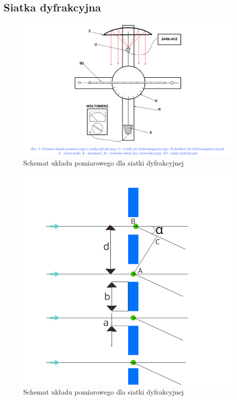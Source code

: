 \documentclass[a4paper]{article}
\newlength{\du}
\begin{document}
\newpage

\subsection{Siatka dyfrakcyjna}
\begin{figure}[h]
\centering
\includegraphics[scale=0.4]{siatka_dyfrakcyjna_rysunek.png}
\caption{Schemat układu pomiarowego dla siatki dyfrakcyjnej}
\label{siatka_dyfrakcyjna}
\end{figure}

\begin{figure}[h]
\centering
\includegraphics[scale=0.4]{siatka.png}
\caption{Schemat układu pomiarowego dla siatki dyfrakcyjnej}
\label{siatka}
\end{figure}
\end{document}
